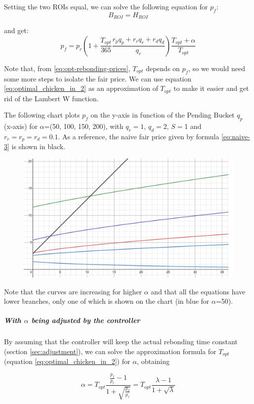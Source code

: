 \documentclass{article}
\begin{document}
Setting the two ROIs equal, we can solve the following equation for $p_f$:
\begin{equation}
  \label{eq:ROI-bonding-holding}
  B_{ROI} = H_{ROI}
\end{equation}

and get:
\begin{equation}
  \label{eq:ROI-bonding-holding-2}
  p_f = p_r\left(1 + \frac{T_{opt}}{365} \frac{r_p q_p + r_r q_r + r_d q_d}{q_r}\right) \frac{T_{opt}+\alpha}{T_{opt}}
\end{equation}

Note that, from \ref{eq:opt-rebonding-prices}, $T_{opt}$ depends on $p_f$, so we would need some more steps to isolate the fair price. We can use equation \ref{eq:optimal_chicken_in_2} as an approximation of $T_{opt}$ to make it easier and get rid of the Lambert W function.

The following chart plots $p_f$ on the y-axis in function of the Pending Bucket $q_p$ (x-axis) for $\alpha$=(50, 100, 150, 200), with $q_r=1$, $q_d=2$, $S=$1 and $r_r=r_p=r_d=0.1$. As a reference, the naive fair price given by formula \ref{eq:naive-3} is shown in black.

\begin{figure}[ht]
    \centering
    \includegraphics[width=0.5\linewidth]{./ChickenBonds_Whitepaper_comparison_price.png}
\end{figure}

Note that the curves are increasing for higher $\alpha$ and that all the equations have lower branches, only one of which is shown on the chart (in blue for $\alpha$=50). 

\subparagraph{With $\alpha$ being adjusted by the controller}
By assuming that the controller will keep the actual rebonding time constant (section \ref{sec:adjustment}), we can solve the approximation formula for $T_{opt}$ (equation \ref{eq:optimal_chicken_in_2}) for $\alpha$, obtaining

\begin{equation}
  \label{eq:alpha-solved}
  \alpha = T_{opt}\frac{\frac{p_f}{p_r} - 1}{1 + \sqrt{\frac{p_f}{p_r}}} = T_{opt}\frac{\lambda - 1}{1 + \sqrt{\lambda}}
\end{equation} 
\end{document}
